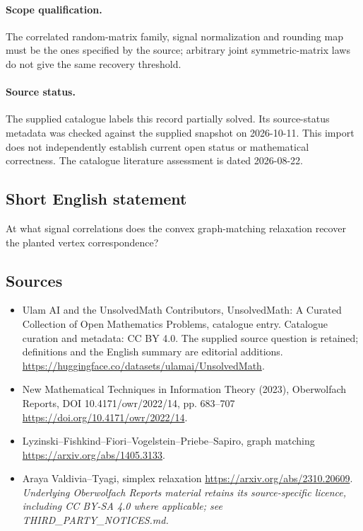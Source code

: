 \documentclass[11pt]{article}
\begin{document}
\paragraph{Scope qualification.}
The correlated random-matrix family, signal normalization and rounding map must be the ones specified by the source; arbitrary joint symmetric-matrix laws do not give the same recovery threshold.
\paragraph{Source status.}
The supplied catalogue labels this record partially solved. Its source-status metadata was checked against the supplied snapshot on 2026-10-11. This import does not independently establish current open status or mathematical correctness. The catalogue literature assessment is dated 2026-08-22.
\subsection{Short English statement}
At what signal correlations does the convex graph-matching relaxation recover the planted vertex correspondence?
\subsection{Sources}
\begin{itemize}
\item[S1] Ulam AI and the UnsolvedMath Contributors, UnsolvedMath: A Curated Collection of Open Mathematics Problems, catalogue entry. Catalogue curation and metadata: CC BY 4.0. The supplied source question is retained; definitions and the English summary are editorial additions.
\url{https://huggingface.co/datasets/ulamai/UnsolvedMath}.
\item[S2] New Mathematical Techniques in Information Theory (2023), Oberwolfach Reports, DOI 10.4171/owr/2022/14, pp. 683--707
\url{https://doi.org/10.4171/owr/2022/14}.
\item[S3] Lyzinski--Fishkind--Fiori--Vogelstein--Priebe--Sapiro, graph matching
\url{https://arxiv.org/abs/1405.3133}.
\item[S4] Araya Valdivia--Tyagi, simplex relaxation
\url{https://arxiv.org/abs/2310.20609}.
\textit{Underlying Oberwolfach Reports material retains its source-specific licence, including CC BY-SA 4.0 where applicable; see THIRD\_PARTY\_NOTICES.md.}
\end{itemize}
\end{document}

